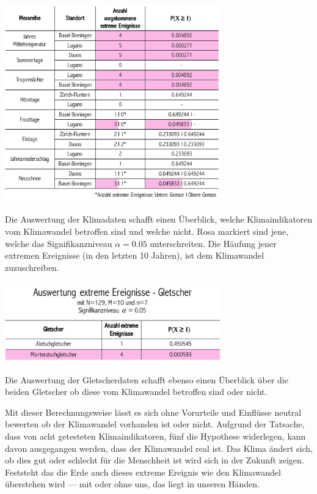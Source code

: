 \begin{refsection}
\begin{table}
\centering
\includegraphics[width=0.7\textwidth]{extrem/AuswertungK.pdf}
\caption{Die Auswertung der Klimadaten schafft einen Überblick, welche Klimaindikatoren vom Klimawandel betroffen sind und welche nicht. Rosa markiert sind jene, welche das Signifikanzniveau $\alpha=0.05$ unterschreiten. Die Häufung jener extremen Ereignisse (in den letzten 10 Jahren), ist dem Klimawandel zuzuschreiben.}
\label{AuswertungK}
\end{table}


\begin{table}
\centering
\includegraphics[width=0.7\textwidth]{extrem/AuswertungG.pdf}
\caption{Die Auswertung der Gletscherdaten schafft ebenso einen Überblick über die beiden Gletscher ob diese vom Klimawandel betroffen sind oder nicht.}
\label{AuswertungG}
\end{table}

Mit dieser Berechnungsweise lässt es sich ohne Vorurteile und Einflüsse neutral bewerten ob der Klimawandel vorhanden ist oder nicht. Aufgrund der Tatsache, dass von acht getesteten Klimaindikatoren, fünf die Hypothese widerlegen, kann davon ausgegangen werden, dass der Klimawandel real ist. Das Klima ändert sich, ob dies gut oder schlecht für die Menschheit ist wird sich in der Zukunft zeigen. Feststeht das die Erde auch dieses extreme Ereignis wie den Klimawandel überstehen wird --- mit oder ohne uns, das liegt in unseren Händen.



\end{refsection}
